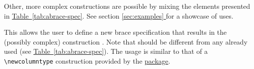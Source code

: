 \documentclass[10pt]{ltxdockit}[2011/03/25]
\begin{document}
Other, more complex constructions are possible by mixing the elements presented in \hyperref[tab:abrace-spec]{Table~\ref*{tab:abrace-spec}}. See section \hyperref[sec:examples]{\ref*{sec:examples} } for a showcase of uses.

\begin{ltxsyntax}


\end{ltxsyntax}

This allows the user to define a new brace specification  that results in the (possibly complex) construction . Note that  should be different from any already used (see \hyperref[tab:abrace-spec]{Table~\ref*{tab:abrace-spec}}). The usage is similar to that of a \lstinline!\newcolumntype! construction provided by the \href{http://ctan.org/pkg/array}{ package}.
\end{document}
